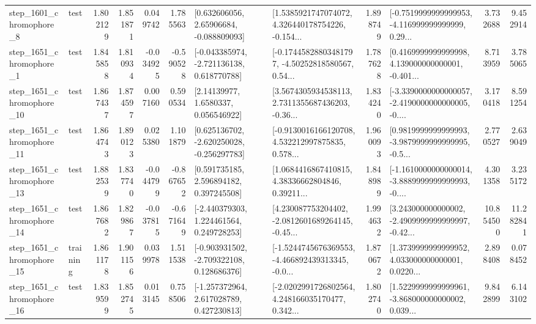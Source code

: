\begin{tabular}{llrrrrllrlrr}
  step\_1601\_chromophore\_8 &      test &      1.802129 &    1.851871 &      0.049742 &  1.785563 &     [0.632606056, 2.65906684, -0.088809093] &  [1.5385921747074072, 4.326440178754226, -0.154... &       1.898749 &  [-0.7519999999999953, -4.116999999999999, 0.29... &            3.732688 &          9.452914 \\
  step\_1651\_chromophore\_1 &      test &      1.845858 &    1.810934 &     -0.034925 & -0.590528 &   [-0.043385974, -2.721136138, 0.618770788] &  [-0.17445828803481797, -4.50252818580567, 0.54... &       1.787628 &  [0.4169999999999998, 4.139000000000001, -0.401... &            8.713959 &          3.785065 \\
 step\_1651\_chromophore\_10 &      test &      1.867437 &    1.874597 &      0.007160 &  0.590534 &        [2.14139977, 1.6580337, 0.056546922] &  [3.5674305934538113, 2.7311355687436203, -0.36... &       1.834240 &  [-3.3390000000000057, -2.4190000000000005, -0.... &            3.170418 &          8.591254 \\
 step\_1651\_chromophore\_11 &      test &      1.864743 &    1.890123 &      0.025380 &  1.101879 &   [0.625136702, -2.620250028, -0.256297783] &  [-0.9130016166120708, 4.532212997875835, 0.578... &       1.960093 &  [0.9819999999999993, -3.9879999999999995, -0.5... &            2.770527 &          2.639049 \\
 step\_1651\_chromophore\_13 &      test &      1.882539 &    1.837740 &     -0.044799 & -0.867652 &     [0.591735185, 2.596894182, 0.397245508] &  [1.0684416867410815, 4.38336662804846, 0.39211... &       1.848989 &  [-1.1610000000000014, -3.8889999999999993, -0.... &            4.301358 &          3.235172 \\
 step\_1651\_chromophore\_14 &      test &      1.867682 &    1.829867 &     -0.037815 & -0.671649 &    [-2.440379303, 1.224461564, 0.249728253] &  [4.230087753204402, -2.0812601689264145, -0.45... &       1.994632 &  [3.243000000000002, -2.4909999999999997, -0.42... &           10.854500 &         11.282841 \\
 step\_1651\_chromophore\_15 &  training &      1.861178 &    1.901156 &      0.039978 &  1.511538 &   [-0.903931502, -2.709322108, 0.128686376] &  [-1.5244745676369553, -4.466892439313345, -0.0... &       1.870672 &  [1.3739999999999952, 4.033000000000001, 0.0220... &            2.898408 &          0.078452 \\
 step\_1651\_chromophore\_16 &      test &      1.839599 &    1.852745 &      0.013145 &  0.758506 &    [-1.257372964, 2.617028789, 0.427230813] &  [-2.0202991726802564, 4.248166035170477, 0.342... &       1.802740 &  [1.5229999999999961, -3.868000000000002, 0.039... &            9.842899 &          6.143102 \\

\end{tabular}
